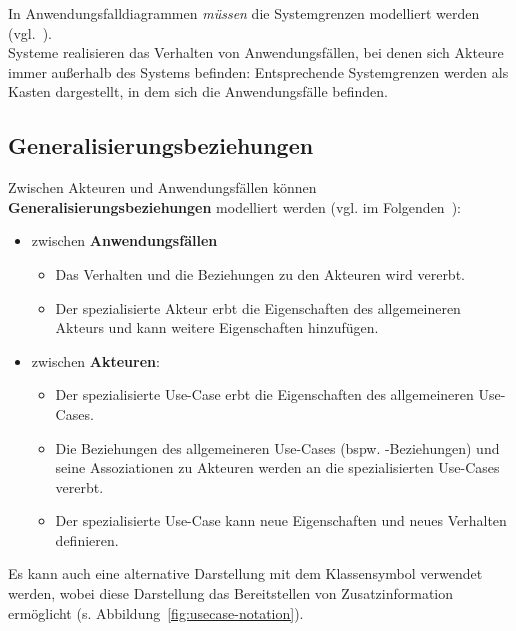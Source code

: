 \noindent
In Anwendungsfalldiagrammen \textit{müssen} die Systemgrenzen modelliert werden (vgl.~\cite[52]{Buh09}).\\
Systeme realisieren das Verhalten von Anwendungsfällen, bei denen sich Akteure immer außerhalb des Systems befinden: Entsprechende Systemgrenzen werden als Kasten dargestellt, in dem sich  die Anwendungsfälle befinden.

\subsection{Generalisierungsbeziehungen}
Zwischen Akteuren und Anwendungsfällen können \textbf{Generalisierungsbeziehungen} modelliert werden (vgl. im Folgenden~\cite[66]{Bal05}):

\begin{itemize}
    \item zwischen \textbf{Anwendungsfällen}
    \begin{itemize}
        \item Das Verhalten und die Beziehungen zu den Akteuren wird vererbt.
        \item Der spezialisierte Akteur erbt die Eigenschaften des allgemeineren Akteurs und kann weitere Eigenschaften hinzufügen.
    \end{itemize}
    \item zwischen \textbf{Akteuren}:
    \begin{itemize}
        \item Der spezialisierte Use-Case erbt die Eigenschaften des allgemeineren Use-Cases.
        \item Die Beziehungen des allgemeineren Use-Cases (bspw. -Beziehungen) und seine Assoziationen zu Akteuren werden an die spezialisierten Use-Cases vererbt.
        \item  Der spezialisierte Use-Case kann neue Eigenschaften und neues Verhalten definieren.
    \end{itemize}
\end{itemize}

\noindent
Es kann auch eine alternative Darstellung mit dem Klassensymbol verwendet werden, wobei diese Darstellung das Bereitstellen von Zusatzinformation ermöglicht (s. Abbildung~\ref{fig:usecase-notation}).


